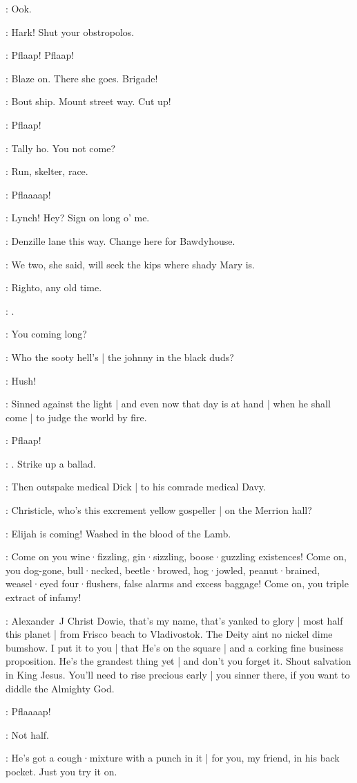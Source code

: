 \bystander:
Ook.


\lynch:
Hark!
Shut your obstropolos.

\bystander:
Pflaap!
Pflaap!

\lenehan:
Blaze on.
There she goes.
Brigade!

\punch:
Bout ship.
Mount street way.
Cut up!

\bystander:
Pflaap!

\lynch:
Tally ho.
You not come?

\Bloom:
Run,
skelter,
race.

\bystander:
Pflaaaap!


\stephen:
Lynch!
Hey?
Sign on long o' me.

\lynch:
Denzille lane this way.
Change here for Bawdyhouse.

\stephen:
We two,
she said,
will seek the kips where shady Mary is.

\lynch:
Righto,
any old time.

\stephen:
.

\lynch:
You coming long?

\stephen:
Who the sooty hell's |
the johnny in the black duds?

\lynch:
Hush!

\dowie:
Sinned against the light |
and even now that day is at hand |
when he shall come |
to judge the world by fire.

\bystander:
Pflaap!

\stephen:
.
Strike up a ballad.

\lynch:
Then outspake medical Dick |
to his comrade medical Davy.

\dixon:
Christicle,
who's this excrement yellow gospeller |
on the Merrion hall?

\dowie:
Elijah is coming!
Washed in the blood of the Lamb.

\dowie:
Come on you wine·fizzling,
gin·sizzling,
boose·guzzling existences!
Come on,
you dog-gone,
bull·necked,
beetle·browed,
hog·jowled,
peanut·brained,
weasel·eyed four·flushers,
false alarms and excess baggage!
Come on,
you triple extract of infamy!

\dowie:
Alexander~J Christ Dowie,
that's my name,
that's yanked to glory |
most half this planet |
from Frisco beach to Vladivostok.
The Deity aint no nickel dime bumshow.
I put it to you |
that He's on the square |
and a corking fine business proposition.
He's the grandest thing yet |
and don't you forget it.
Shout salvation in King Jesus.
You'll need to rise precious early |
you sinner there,
if you want to diddle the Almighty God.

\bystander:
Pflaaaap!

\stephen:
Not half.

\dowie:
He's got a cough·mixture with a punch in it |
for you,
my friend,
in his back pocket.
Just you try it on.


